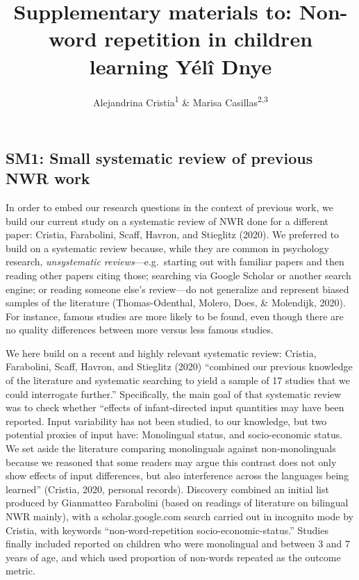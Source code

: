 \documentclass[
  american,
  ,doc,floatsintext]{apa6}
\title{Supplementary materials to: Non-word repetition in children learning Yélî Dnye}
\author{Alejandrina Cristia\textsuperscript{1} \& Marisa Casillas\textsuperscript{2,3}}
\date{}
\affiliation{\vspace{0.5cm}\textsuperscript{1} Laboratoire de Sciences Cognitives et de Psycholinguistique, Département d'Etudes Cognitives, ENS, EHESS, CNRS, PSL University\\\textsuperscript{2} Max Planck Institute for Psycholinguistics\\\textsuperscript{3} University of Chicago}
\begin{document}
\maketitle

\hypertarget{sm1-small-systematic-review-of-previous-nwr-work}{%
\subsection{SM1: Small systematic review of previous NWR work}\label{sm1-small-systematic-review-of-previous-nwr-work}}

In order to embed our research questions in the context of previous work, we build our current study on a systematic review of NWR done for a different paper: Cristia, Farabolini, Scaff, Havron, and Stieglitz (2020). We preferred to build on a systematic review because, while they are common in psychology research, \emph{unsystematic reviews}---e.g.~starting out with familiar papers and then reading other papers citing those; searching via Google Scholar or another search engine; or reading someone else's review---do not generalize and represent biased samples of the literature (Thomas-Odenthal, Molero, Does, \& Molendijk, 2020). For instance, famous studies are more likely to be found, even though there are no quality differences between more versus less famous studies.

We here build on a recent and highly relevant systematic review: Cristia, Farabolini, Scaff, Havron, and Stieglitz (2020) ``combined our previous knowledge of the literature and systematic searching to yield a sample of 17 studies that we could interrogate further.'' Specifically, the main goal of that systematic review was to check whether ``effects of infant-directed input quantities may have been reported. Input variability has not been studied, to our knowledge, but two potential proxies of input have: Monolingual status, and socio-economic status. We set aside the literature comparing monolinguals against non-monolinguals because we reasoned that some readers may argue this contrast does not only show effects of input differences, but also interference across the languages being learned'' (Cristia, 2020, personal records). Discovery combined an initial list produced by Gianmatteo Farabolini (based on readings of literature on bilingual NWR mainly), with a scholar.google.com search carried out in incognito mode by Cristia, with keywords ``non-word-repetition socio-economic-status.'' Studies finally included reported on children who were monolingual and between 3 and 7 years of age, and which used proportion of non-words repeated as the outcome metric.
\end{document}
